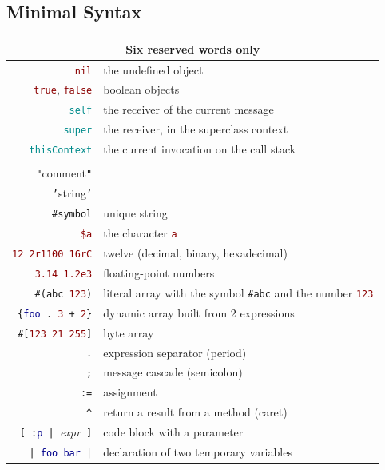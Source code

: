 \documentclass[notumble]{leaflet}
\newcommand{\code}[1]{\foreignlanguage{english}{\texttt{#1}}}
\begin{document}
\pagebreak{}

\subsection{Minimal Syntax}

\noindent
\begin{tabularx}{\linewidth}{@{}rX@{}}
        \toprule
        \multicolumn{2}{c}{Six reserved words only}\\
        \midrule
        \textcolor{darkRed}{\code{nil}} & the undefined object\\
        \textcolor{darkRed}{\code{true}}, \textcolor{darkRed}{\code{false}} & boolean objects\\
        \textcolor{darkCyan}{\code{self}} & the receiver of the current message\\
        \textcolor{darkCyan}{\code{super}} & the receiver, in the superclass context\\
        \textcolor{darkCyan}{\code{thisContext}} & the current invocation on the call stack\\
        \addlinespace

        \toprule
        \multicolumn{2}{c}{Reserved punctuation characters}\\
        \midrule
        \textcolor{comment}{\code{"}{comment}\code{"}} & \\
        \textcolor{string}{\code{'}{string}\code{'}} & \\
        \textcolor{string}{\code{\#symbol}} & unique string \\
        \textcolor{darkRed}{\code{\$a}} & the character \textcolor{darkRed}{\code{a}} \\
        \textcolor{darkRed}{\code{12 2r1100 16rC}} & twelve (decimal, binary, hexadecimal)\\
        \textcolor{darkRed}{\code{3.14 1.2e3}} & floating-point numbers\\
        \code{\#(\textcolor{string}{abc} \textcolor{darkRed}{123})} & literal array with the symbol \textcolor{string}{\code{\#abc}} and the number \textcolor{darkRed}{\code{123}} \\
        \code{\{\textcolor{darkBlue}{foo}\,.\ \textcolor{darkRed}{3}\,+\,\textcolor{darkRed}{2}\}} & dynamic array built from 2 expressions\\
        \code{\#[\textcolor{darkRed}{123 21 255}]} & byte array \\
        \code{.} & expression separator (period)\\
        \code{;} & message cascade (semicolon)\\
        \code{:=} & {assignment} \\
        \code{\textasciicircum} & return a result from a method (caret)\\
        \code{[\,:\textcolor{darkBlue}{p}\,|\,}\emph{expr}\code{\,]} & code block with a parameter \\
        \code{|\,\textcolor{darkBlue}{foo bar}\,|} & declaration of two temporary variables \\
        \bottomrule
\end{tabularx}
\end{document}
